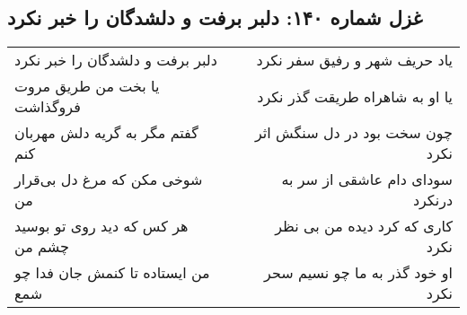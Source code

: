 \begin{center}
\section*{غزل شماره ۱۴۰: دلبر برفت و دلشدگان را خبر نکرد}
\label{sec:sh140}
\begin{longtable}{l p{0.5cm} r}
دلبر برفت و دلشدگان را خبر نکرد
&&
یاد حریف شهر و رفیق سفر نکرد
\\
یا بخت من طریق مروت فروگذاشت
&&
یا او به شاهراه طریقت گذر نکرد
\\
گفتم مگر به گریه دلش مهربان کنم
&&
چون سخت بود در دل سنگش اثر نکرد
\\
شوخی مکن که مرغ دل بی‌قرار من
&&
سودای دام عاشقی از سر به درنکرد
\\
هر کس که دید روی تو بوسید چشم من
&&
کاری که کرد دیده من بی نظر نکرد
\\
من ایستاده تا کنمش جان فدا چو شمع
&&
او خود گذر به ما چو نسیم سحر نکرد
\\
\end{longtable}
\end{center}
